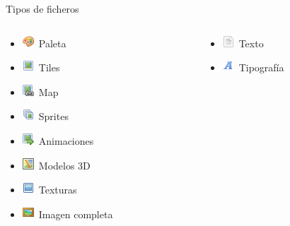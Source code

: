 \begin{frame}{Tipos de ficheros}
    \begin{columns}
    \begin{column}{0.5\textwidth}
        \begin{itemize}
            \item \includegraphics{imgs/palette.png}~Paleta
            \item \includegraphics{imgs/picture.png}~Tiles
            \item \includegraphics{imgs/picture_link.png}~Map
            \item \includegraphics{imgs/pictures.png}~Sprites
            \item \includegraphics{imgs/picture_go.png}~Animaciones
            \item \includegraphics{imgs/map.png}~Modelos 3D
            \item \includegraphics{imgs/image.png}~Texturas
            \item \includegraphics{imgs/photo.png}~Imagen completa
        \end{itemize}
    \end{column}
    \hfill
    \begin{column}{0.5\textwidth}
        \begin{itemize}
            \item \includegraphics{imgs/page_white_text.png}~Texto
            \item \includegraphics{imgs/font.png}~Tipografía

\end{itemize}
\end{column}
\end{columns}
\end{frame}
